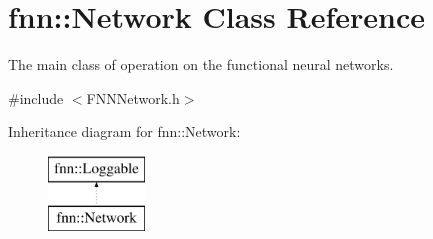 \hypertarget{classfnn_1_1_network}{}\section{fnn\+:\+:Network Class Reference}
\label{classfnn_1_1_network}


The main class of operation on the functional neural networks.  




{\ttfamily \#include $<$F\+N\+N\+Network.\+h$>$}

Inheritance diagram for fnn\+:\+:Network\+:\begin{figure}[H]
\begin{center}
\leavevmode
\includegraphics[height=2.000000cm]{classfnn_1_1_network}
\end{center}
\end{figure}
